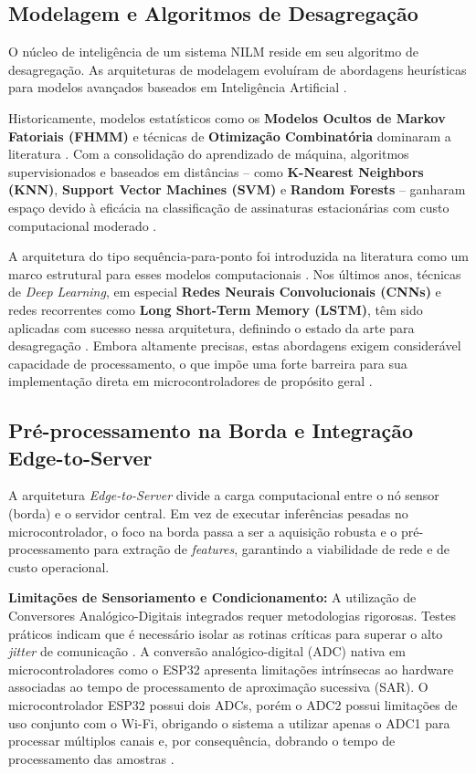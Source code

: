 \documentclass[12pt]{article}
\begin{document}
\subsection{Modelagem e Algoritmos de Desagrega\c{c}\~ao}

O n\'ucleo de intelig\^encia de um sistema NILM reside em seu algoritmo de
desagrega\c{c}\~ao. As arquiteturas de modelagem evolu\'iram de abordagens
heur\'isticas para modelos avan\c{c}ados baseados em Intelig\^encia Artificial
\cite{ref4}.

Historicamente, modelos estat\'isticos como os \textbf{Modelos Ocultos de Markov
Fatoriais (FHMM)} e t\'ecnicas de \textbf{Otimiza\c{c}\~ao Combinat\'oria}
dominaram a literatura \cite{ref2,ref3,ref4}. Com a consolida\c{c}\~ao do aprendizado de
m\'aquina, algoritmos supervisionados e baseados em dist\^ancias -- como
\textbf{K-Nearest Neighbors (KNN)}, \textbf{Support Vector Machines (SVM)} e
\textbf{Random Forests} -- ganharam espa\c{c}o devido \`a efic\'acia na
classifica\c{c}\~ao de assinaturas estacion\'arias com custo computacional moderado
\cite{ref6}.

A arquitetura do tipo sequ\^encia-para-ponto foi introduzida na literatura como um
marco estrutural para esses modelos computacionais \cite{ref5}. Nos \'ultimos anos,
t\'ecnicas de \textit{Deep Learning}, em especial \textbf{Redes Neurais
Convolucionais (CNNs)} e redes recorrentes como \textbf{Long Short-Term Memory
(LSTM)}, t\^em sido aplicadas com sucesso nessa arquitetura, definindo o estado da
arte para desagrega\c{c}\~ao \cite{ref7}. Embora altamente precisas, estas
abordagens exigem consider\'avel capacidade de processamento, o que imp\~oe uma
forte barreira para sua implementa\c{c}\~ao direta em microcontroladores de
prop\'osito geral \cite{ref7}.

\subsection{Pr\'e-processamento na Borda e Integra\c{c}\~ao Edge-to-Server}

A arquitetura \textit{Edge-to-Server} divide a carga computacional entre o n\'o
sensor (borda) e o servidor central. Em vez de executar infer\^encias pesadas no
microcontrolador, o foco na borda passa a ser a aquisi\c{c}\~ao robusta e o
pr\'e-processamento para extra\c{c}\~ao de \textit{features}, garantindo a
viabilidade de rede e de custo operacional.

\textbf{Limita\c{c}\~oes de Sensoriamento e Condicionamento:} A utiliza\c{c}\~ao
de Conversores Anal\'ogico-Digitais integrados requer metodologias rigorosas.
Testes pr\'aticos indicam que \'e necess\'ario isolar as rotinas cr\'iticas para
superar o alto \textit{jitter} de comunica\c{c}\~ao \cite{ref8}. A convers\~ao
anal\'ogico-digital (ADC) nativa em microcontroladores como o ESP32 apresenta
limita\c{c}\~oes intr\'insecas ao hardware associadas ao tempo de processamento de
aproxima\c{c}\~ao sucessiva (SAR). O microcontrolador ESP32 possui dois ADCs, por\'em
o ADC2 possui limita\c{c}\~oes de uso conjunto com o Wi-Fi, obrigando o sistema a
utilizar apenas o ADC1 para processar m\'ultiplos canais e, por consequ\^encia,
dobrando o tempo de processamento das amostras \cite{ref8}.
\end{document}
